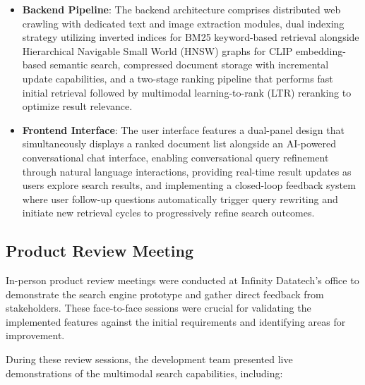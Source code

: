 \documentclass{report}
\begin{document}
\begin{itemize}
    \item \textbf{Backend Pipeline}: The backend architecture comprises distributed web crawling with dedicated text and image extraction modules, dual indexing strategy utilizing inverted indices for BM25 keyword-based retrieval alongside Hierarchical Navigable Small World (HNSW) graphs for CLIP embedding-based semantic search, compressed document storage with incremental update capabilities, and a two-stage ranking pipeline that performs fast initial retrieval followed by multimodal learning-to-rank (LTR) reranking to optimize result relevance.
    \item \textbf{Frontend Interface}: The user interface features a dual-panel design that simultaneously displays a ranked document list alongside an AI-powered conversational chat interface, enabling conversational query refinement through natural language interactions, providing real-time result updates as users explore search results, and implementing a closed-loop feedback system where user follow-up questions automatically trigger query rewriting and initiate new retrieval cycles to progressively refine search outcomes.
\end{itemize}

\subsection{Product Review Meeting}

In-person product review meetings were conducted at Infinity Datatech's office to demonstrate the search engine prototype and gather direct feedback from stakeholders. These face-to-face sessions were crucial for validating the implemented features against the initial requirements and identifying areas for improvement.

During these review sessions, the development team presented live demonstrations of the multimodal search capabilities, including:
\end{document}
